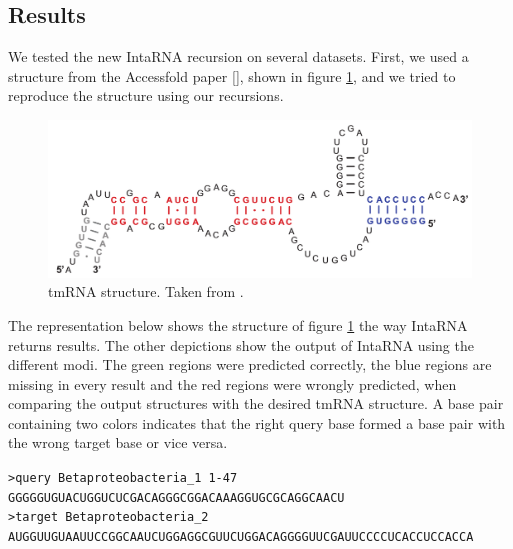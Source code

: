 \documentclass[11pt,a4paper]{report}
\begin{document}
\subsection*{Results}
We tested the new IntaRNA recursion on several datasets. First, we used a structure from the Accessfold paper [\cite{doi:10.1093/bioinformatics/btv682}], shown in figure \ref{accessfold}, and we tried to reproduce the structure using our recursions. \\
\begin{figure}[H]
\includegraphics[scale=0.33]{Accessfold.png}
\caption{tmRNA structure. Taken from \cite{doi:10.1093/bioinformatics/btv682}.}
\label{accessfold}
\end{figure}
\noindent
The representation below shows the structure of figure \ref{accessfold} the way IntaRNA returns results. The other depictions show the output of IntaRNA using the different modi. The green regions were predicted correctly, the blue regions are missing in every result and the red regions were wrongly predicted, when comparing the output structures with the desired tmRNA structure. A base pair containing two colors indicates that the right query base formed a base pair with the wrong target base or vice versa.\\
\newpage
\begin{spacing}{0.5}
\noindent
{\tiny\texttt{>query Betaproteobacteria\_1 1-47}\\
\texttt{GGGGGUGUACUGGUCUCGACAGGGCGGACAAAGGUGCGCAGGCAACU}\\
\texttt{>target Betaproteobacteria\_2}\\
\texttt{AUGGUUGUAAUUCCGGCAAUCUGGAGGCGUUCUGGACAGGGGUUCGAUUCCCCUCACCUCCACCA}\\\\}
\end{spacing}
\end{document}
